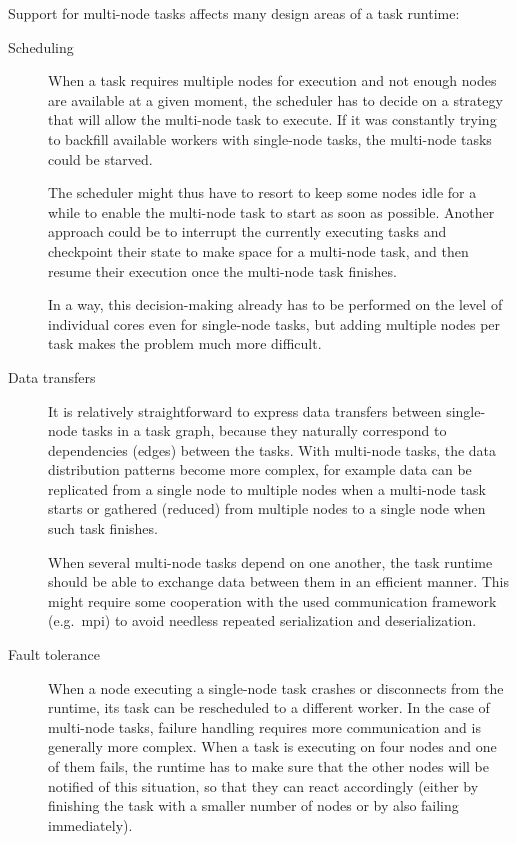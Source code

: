 Support for multi-node tasks affects many design areas of a task runtime:
\begin{description}
	\item[Scheduling] When a task requires multiple nodes for execution and not enough nodes are available at a given
		moment, the scheduler has to decide on a strategy that will allow the multi-node task to execute.
		If it was constantly trying to backfill available workers with single-node tasks, the multi-node
		tasks could be starved.

		The scheduler might thus have to resort to keep some nodes idle for a while to enable the
		multi-node task to start as soon as possible. Another approach could be to interrupt the currently
		executing tasks and checkpoint their state to make space for a multi-node task, and then resume
		their execution once the multi-node task finishes.

		In a way, this decision-making already has to be performed on the level of individual cores even
		for single-node tasks, but adding multiple nodes per task makes the problem much more difficult.
	\item[Data transfers] It is relatively straightforward to express data transfers between single-node tasks in a task
		graph, because they naturally correspond to dependencies (edges) between the tasks. With multi-node
		tasks, the data distribution patterns become more complex, for example data can be replicated from
		a single node to multiple nodes when a multi-node task starts or gathered (reduced) from multiple
		nodes to a single node when such task finishes.

		When several multi-node tasks depend on one another, the task runtime should be able to exchange
		data between them in an efficient manner. This might require some cooperation with the used
		communication framework (e.g.\ \gls{mpi}) to avoid needless repeated serialization
		and deserialization.
	\item[Fault tolerance] When a node executing a single-node task crashes or disconnects from the runtime, its task can be
		rescheduled to a different worker. In the case of multi-node tasks, failure handling requires more
		communication and is generally more complex. When a task is executing on four nodes and one of them
		fails, the runtime has to make sure that the other nodes will be notified of this situation, so
		that they can react accordingly (either by finishing the task with a smaller number of nodes or by
		also failing immediately).
\end{description}

